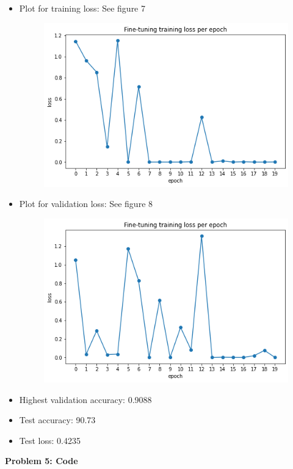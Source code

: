 \begin{enumerate}
\begin{itemize}
	    \item Plot for training loss: See figure 7
		\begin{figure}[h!]
		    \centering
		    \includegraphics[width=0.8\linewidth]{../plots/ft_t.png}
		    \caption{}
		\end{figure}
	    \item Plot for validation loss: See figure 8
		\begin{figure}[h!]
		    \centering
		    \includegraphics[width=0.8\linewidth]{../plots/ft_v.png}
		    \caption{}
		\end{figure}
	    \item Highest validation accuracy: 0.9088
	    \item Test accuracy: 90.73
	    \item Test loss: 0.4235
	\end{itemize}
\end{enumerate}

{\bf Problem 5: Code}


